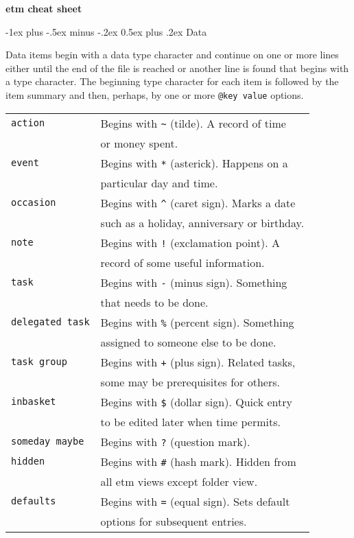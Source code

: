 \documentclass[9pt,landscape]{article}
\makeatletter
\renewcommand{\section}{\@startsection{section}{1}{0mm}%
                                {-1ex plus -.5ex minus -.2ex}%
                                {0.5ex plus .2ex}%
                                {\normalfont\large\bfseries}}
\makeatother
\begin{document}
\raggedright
\footnotesize
\begin{multicols}{3}

\setlength{\premulticols}{1pt}
\setlength{\postmulticols}{1pt}
\setlength{\multicolsep}{1pt}
\setlength{\columnsep}{2pt}

\begin{center}
     \Large{\textbf{etm cheat sheet}} \\
\end{center}

\section{Data}

Data items begin with a data type character and continue on one or more lines either until the end of the file is reached or another line is found that begins with a type character. The beginning type character for each item is followed by the item summary and then, perhaps, by one or more \verb!@key value! options.
\vskip 3pt

\begin{tabular}{@{}ll@{}}
\verb!action!  & Begins with \verb!~! (tilde). A record of time \\
               & or money spent. \\
\verb!event!   & Begins with \verb!*! (asterick). Happens on a \\
               & particular day and time. \\
\verb!occasion! & Begins with \verb!^! (caret sign). Marks a date \\
               & such as a  holiday, anniversary or birthday. \\
\verb!note!   & Begins with \verb'!' (exclamation point). A \\
              & record of some useful information. \\
\verb!task!   & Begins with \verb!-! (minus sign). Something  \\
              & that needs to be done. \\
\verb!delegated task!   & Begins with \verb!%! (percent sign). Something \\
              & assigned to someone else to be done. \\
\verb!task group!   & Begins with \verb!+! (plus sign). Related tasks, \\
              & some may be prerequisites for others. \\
\verb!inbasket!   & Begins with \verb!$! (dollar sign). Quick entry \\
              & to be edited later when time permits. \\
\verb!someday maybe!   & Begins with \verb!?! (question mark). \\
\verb!hidden!   & Begins with \verb!#! (hash mark). Hidden from \\
              & all etm views except folder view. \\
\verb!defaults!   & Begins with \verb!=! (equal sign). Sets default \\
              & options for subsequent entries. \\
\end{tabular}



\end{multicols}
\end{document}
